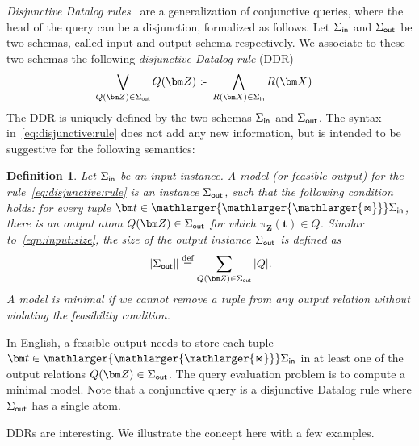 \documentclass[10pt,a4paper]{article}
\newtheorem{definition}{Definition}[section]
\newcommand{\norm}[1]{\|#1\|}
\newcommand{\defeq}{\stackrel{\text{def}}{=}}
\newcommand{\cd}{\text{ :- }}
\newcommand{\bigjoin}{\mathlarger{\mathlarger{\mathlarger{\Join}}}}
\newcommand{\inn}{\text{\sf in}}
\newcommand{\out}{\text{\sf out}}
\begin{document}
{\em Disjunctive Datalog rules}~\cite{DBLP:journals/tods/EiterGM97} are a
generalization of conjunctive queries, where the head of the query
can be a disjunction, formalized as follows.
Let $\Sigma_{\inn}$ and $\Sigma_{\out}$ be two schemas,
called input and output schema respectively.  We associate to these two schemas the
following \emph{disjunctive Datalog rule} (DDR)
%
\begin{align}
  \bigvee_{Q(\bm Z)\in \Sigma_{\out}} Q(\bm Z) &\cd \bigwedge_{R(\bm X)\in\Sigma_{\inn}} R(\bm X) \label{eq:disjunctive:rule}
\end{align}
%
The DDR is uniquely defined by the two schemas
$\Sigma_{\inn}$ and $\Sigma_{\out}$.  The syntax
in~\eqref{eq:disjunctive:rule} does not add any new information, but
is intended to be suggestive for the following semantics:

\begin{definition} \label{def:feasible} Let $\Sigma_{\inn}$ be an input instance.  A {\em
model} (or {\em feasible output}) for the rule~\eqref{eq:disjunctive:rule} is an instance
$\Sigma_{\out}$, such that the following condition holds:
for every tuple $\bm t \in \bigjoin \Sigma_{\inn}$, there is an output atom
$Q(\bm Z) \in \Sigma_{\out}$ for which $\pi_{\bm Z}(\bm t) \in Q$.
Similar to~\eqref{eqn:input:size},
the {\em size} of the output instance $\Sigma_{\out}$ is defined as
\begin{align}
\norm{\Sigma_{\out}} \defeq \sum_{Q(\bm Z) \in \Sigma_{\out}} |Q|. \label{eqn:ddr:size}
\end{align}
A model is {\em minimal} if we cannot remove a tuple from any output relation without
violating the feasibility condition.
\end{definition}

%
In English, a feasible output needs to store each tuple
$\bm t \in \bigjoin \Sigma_{\inn}$ in at least one of the output
relations $Q(\bm Z) \in \Sigma_{\out}$.  The query evaluation problem
is to compute a minimal model. Note that a conjunctive query is a disjunctive Datalog rule
where $\Sigma_{\out}$ has a single atom.

DDRs are interesting. We illustrate the concept here with a few examples.
\end{document}
